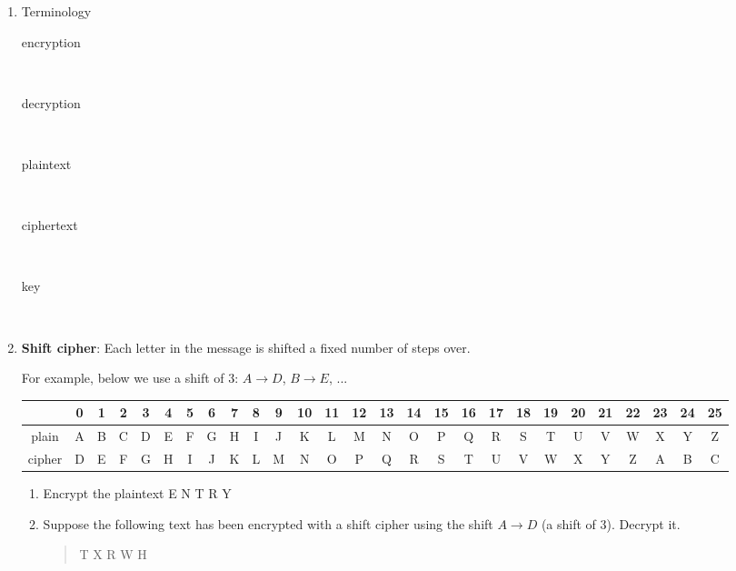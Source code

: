 \documentclass[12pt]{article}
\renewcommand{\emph}[1]{\textsf{\textbf{#1}}}
\newcommand{\be}{\begin{enumerate}}
\newcommand{\ee}{\end{enumerate}}
\begin{document}
\begin{enumerate}
\item Terminology
\begin{description}
\item[encryption] \
\vfill

\item[decryption] \ \vfill


\item[plaintext] \ \vfill

\item[ciphertext] \

\vfill

\item[key] \ \vfill

\end{description}

\item \emph{Shift cipher}: Each letter in the message is shifted a fixed number of  steps over.

For example, below we use a shift of 3:  $A \to D$, $B \to E$, ...

{\scriptsize
\hspace*{-1.8cm}
\begin{tabular}{|c|c|c|c|c|c|c|c|c|c|c|c|c|c|c|c|c|c|c|c|c|c|c|c|c|c|c|}
\hline
&0&1&2&3&4&5&6&7&8&9&10&11&12&13&14&15&16&17&18&19&20&21&22&23&24&25\\ \hline \hline
plain& A&B&C&D&E&F&G&H&I&J&K&L&M&N&O&P&Q&R&S&T&U&V&W&X&Y&Z\\  \hline
cipher&D&E&F&G&H&I&J&K&L&M&N&O&P&Q&R&S&T&U&V&W&X&Y&Z&A&B&C\\
\hline
\end{tabular}
}

\be
\item Encrypt the plaintext \textsf{E N T R Y}

\vfill

\item Suppose the following text has been encrypted with a shift cipher using the shift $A \to D$ (a shift of 3). Decrypt it.
\begin{quote}\textsf{T X R W H} \end{quote}

\vfill

\ee
\end{enumerate}
\end{document}
